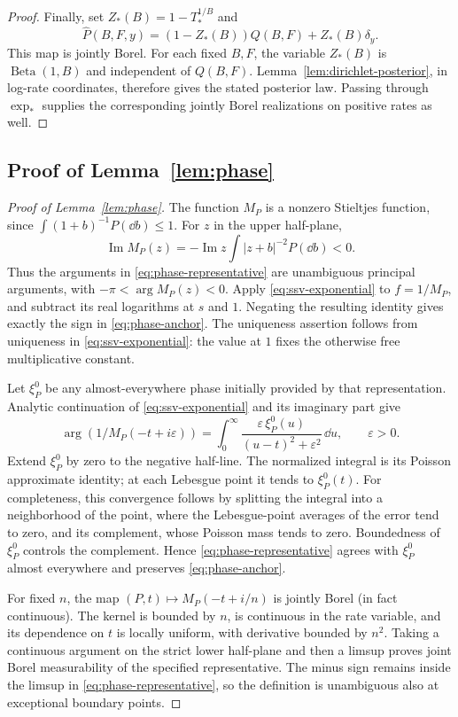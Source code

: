 \begin{proof}
Finally, set \(Z_*(B)=1-T_*^{1/B}\) and
\[
 \widehat P(B,F,y)=(1-Z_*(B))Q(B,F)+Z_*(B)\delta_y.
\]
This map is jointly Borel.
For each fixed \(B,F\), the variable \(Z_*(B)\) is \(\operatorname{Beta}(1,B)\) and independent of \(Q(B,F)\).
Lemma~\ref{lem:dirichlet-posterior}, in log-rate coordinates, therefore gives the stated posterior law.
Passing through \(\exp_*\) supplies the corresponding jointly Borel realizations on positive rates as well.
\end{proof}


\subsection{Proof of Lemma~\ref{lem:phase}}
\label{sec:phase-proof}

\begin{proof}[Proof of Lemma~\ref{lem:phase}]
The function \(M_P\) is a nonzero Stieltjes function, since \(\int(1+b)^{-1}P(\dd b)\le1\).
For \(z\) in the upper half-plane,
\[
  \operatorname{Im}M_P(z)
  =-\operatorname{Im}z\int|z+b|^{-2}P(\dd b)<0.
\]
Thus the arguments in \eqref{eq:phase-representative} are unambiguous principal arguments, with \(-\pi<\arg M_P(z)<0\).
Apply \eqref{eq:ssv-exponential} to \(f=1/M_P\), and subtract its real logarithms at \(s\) and \(1\).
Negating the resulting identity gives exactly the sign in \eqref{eq:phase-anchor}.
The uniqueness assertion follows from uniqueness in \eqref{eq:ssv-exponential}: the value at \(1\) fixes the otherwise free multiplicative constant.

Let \(\xi_P^0\) be any almost-everywhere phase initially provided by that representation.
Analytic continuation of \eqref{eq:ssv-exponential} and its imaginary part give
\[
  \arg(1/M_P(-t+i\varepsilon))
  =\int_0^\infty
       \frac{\varepsilon\,\xi_P^0(u)}
            {(u-t)^2+\varepsilon^2}\,\dd u,
  \qquad \varepsilon>0.
\]
Extend \(\xi_P^0\) by zero to the negative half-line.
The normalized integral is its Poisson approximate identity; at each Lebesgue point it tends to \(\xi_P^0(t)\).
For completeness, this convergence follows by splitting the integral into a neighborhood of the point, where the Lebesgue-point averages of the error tend to zero, and its complement, whose Poisson mass tends to zero.
Boundedness of \(\xi_P^0\) controls the complement.
Hence \eqref{eq:phase-representative} agrees with \(\xi_P^0\) almost everywhere and preserves \eqref{eq:phase-anchor}.

For fixed \(n\), the map \((P,t)\mapsto M_P(-t+i/n)\) is jointly Borel (in fact continuous).
The kernel is bounded by \(n\), is continuous in the rate variable, and its dependence on \(t\) is locally uniform, with derivative bounded by \(n^2\).
Taking a continuous argument on the strict lower half-plane and then a limsup proves joint Borel measurability of the specified representative.
The minus sign remains inside the limsup in \eqref{eq:phase-representative}, so the definition is unambiguous also at exceptional boundary points.


\end{proof}
